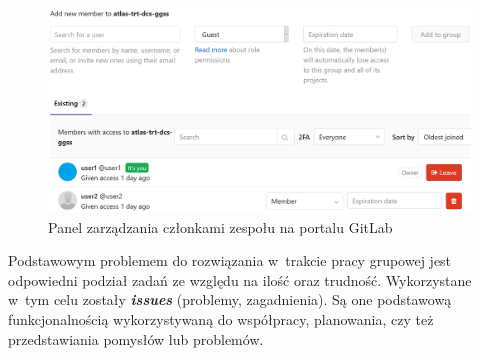 \begin{figure}[H]
\centering
\includegraphics[width=\textwidth]{res/png/memberManagementPanel}
\caption{Panel zarządzania członkami zespołu na portalu GitLab}
\label{fig:memMan}
\end{figure}


Podstawowym problemem do rozwiązania w~trakcie pracy grupowej jest odpowiedni podział zadań ze względu na ilość oraz trudność. Wykorzystane w~tym celu zostały \textit{\textbf{issues}} (problemy, zagadnienia). Są one podstawową funkcjonalnością wykorzystywaną do współpracy, planowania, czy też przedstawiania pomysłów lub problemów.

